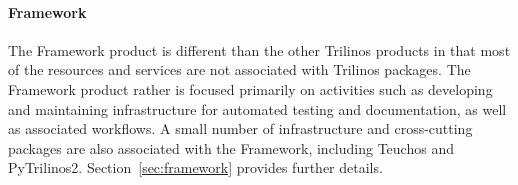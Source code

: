 \paragraph{Framework} The Framework product is different than the other Trilinos products in that most of the resources and services are not associated with Trilinos packages. The Framework product rather is focused primarily on activities such as developing and maintaining infrastructure for automated testing and documentation, as well as associated workflows. A small number of infrastructure and cross-cutting packages are also associated with the Framework, including Teuchos and PyTrilinos2. Section~\ref{sec:framework} provides further details.
